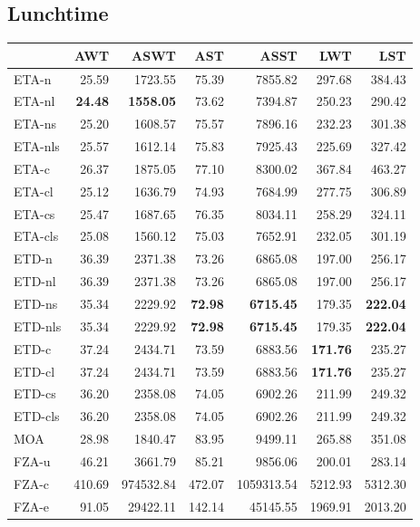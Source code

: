 \documentclass{UoYCSproject}
\begin{document}
\subsection{Lunchtime}

\begin{tabular}{l | r r r r r r}
	& AWT & ASWT & AST & ASST & LWT & LST \\
	\hline
	ETA-n & 25.59 & 1723.55 & 75.39 & 7855.82 & 297.68 & 384.43 \\
	ETA-nl & \textbf{24.48} & \textbf{1558.05} & 73.62 & 7394.87 & 250.23 & 290.42 \\
	ETA-ns & 25.20 & 1608.57 & 75.57 & 7896.16 & 232.23 & 301.38 \\
	ETA-nls & 25.57 & 1612.14 & 75.83 & 7925.43 & 225.69 & 327.42 \\
	ETA-c & 26.37 & 1875.05 & 77.10 & 8300.02 & 367.84 & 463.27 \\
	ETA-cl & 25.12 & 1636.79 & 74.93 & 7684.99 & 277.75 & 306.89 \\
	ETA-cs & 25.47 & 1687.65 & 76.35 & 8034.11 & 258.29 & 324.11 \\
	ETA-cls & 25.08 & 1560.12 & 75.03 & 7652.91 & 232.05 & 301.19 \\
	\hline
	ETD-n & 36.39 & 2371.38 & 73.26 & 6865.08 & 197.00 & 256.17 \\
	ETD-nl & 36.39 & 2371.38 & 73.26 & 6865.08 & 197.00 & 256.17 \\
	ETD-ns & 35.34 & 2229.92 & \textbf{72.98} & \textbf{6715.45} & 179.35 & \textbf{222.04} \\
	ETD-nls & 35.34 & 2229.92 & \textbf{72.98} & \textbf{6715.45} & 179.35 & \textbf{222.04} \\
	ETD-c & 37.24 & 2434.71 & 73.59 & 6883.56 & \textbf{171.76} & 235.27 \\
	ETD-cl & 37.24 & 2434.71 & 73.59 & 6883.56 & \textbf{171.76} & 235.27 \\
	ETD-cs & 36.20 & 2358.08 & 74.05 & 6902.26 & 211.99 & 249.32 \\
	ETD-cls & 36.20 & 2358.08 & 74.05 & 6902.26 & 211.99 & 249.32 \\
	\hline
	MOA & 28.98 & 1840.47 & 83.95 & 9499.11 & 265.88 & 351.08 \\
	\hline
	FZA-u & 46.21 & 3661.79 & 85.21 & 9856.06 & 200.01 & 283.14 \\
	FZA-c & 410.69 & 974532.84 & 472.07 & 1059313.54 & 5212.93 & 5312.30 \\
	FZA-e & 91.05 & 29422.11 & 142.14 & 45145.55 & 1969.91 & 2013.20
\end{tabular}
\end{document}
